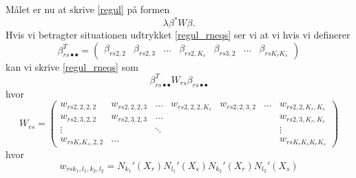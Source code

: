 \documentclass[a4paper, 12pt]{memoir}
\begin{document}
Målet er nu at skrive \eqref{regul} på formen
\begin{equation*}
\lambda \beta^* W \beta.
\end{equation*}
Hvis vi betragter situationen udtrykket \eqref{regul_rneqs} ser vi at vi hvis vi definerer 
\begin{equation*}
\beta_{rs\bullet\bullet}^T=\begin{pmatrix}
\beta_{rs2,2} &\beta_{rs2,3} &\dots & \beta_{rs2,K_s} &\beta_{rs3,2} & \dots & \beta_{rsK_rK_s}
\end{pmatrix}
\end{equation*}
kan vi skrive \eqref{regul_rneqs} som 
\begin{equation*}
\beta_{rs\bullet\bullet}^TW_{rs}\beta_{rs\bullet\bullet}
\end{equation*}
hvor 
\begin{equation}
W_{rs}=\begin{pmatrix}
w_{rs2,2,2,2} & w_{rs2,2,2,3}& \dots & w_{rs2,2,2,K_s} & w_{rs2,2,3,2} &\dots &w_{rs2,2,K_r,K_s}\\
w_{rs2,3,2,2} &  w_{rs2,3,2,3} & \dots &&&&w_{rs2,3,K_r,K_s}\\
\vdots &&\ddots &&&&\vdots\\
w_{rsK_rK_s,2,2}&\dots &&&&&w_{rsK_rK_sK_rK_s}
\end{pmatrix}
\end{equation}
hvor
\begin{equation}
w_{rsk_1,l_1,k_2,l_2}=N_{k_1}'(X_r)N_{l_1}'(X_s)N_{k_2}'(X_r)N_{l_2}'(X_s)
\end{equation}
\end{document}
